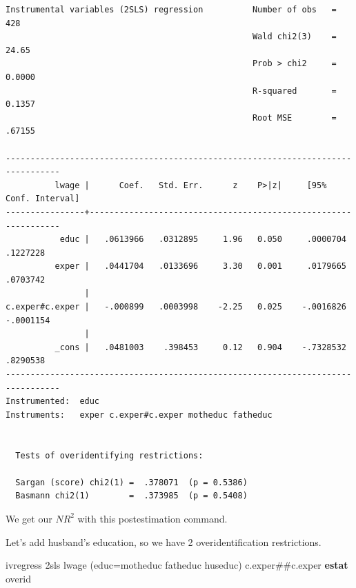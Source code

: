 \documentclass[
]{book}
\newenvironment{Shaded}{\begin{snugshade}}{\end{snugshade}}
\newcommand{\KeywordTok}[1]{\textcolor[rgb]{0.13,0.29,0.53}{\textbf{#1}}}
\newcommand{\NormalTok}[1]{#1}
\begin{document}
\begin{verbatim}
Instrumental variables (2SLS) regression          Number of obs   =        428
                                                  Wald chi2(3)    =      24.65
                                                  Prob > chi2     =     0.0000
                                                  R-squared       =     0.1357
                                                  Root MSE        =     .67155

---------------------------------------------------------------------------------
          lwage |      Coef.   Std. Err.      z    P>|z|     [95% Conf. Interval]
----------------+----------------------------------------------------------------
           educ |   .0613966   .0312895     1.96   0.050     .0000704    .1227228
          exper |   .0441704   .0133696     3.30   0.001     .0179665    .0703742
                |
c.exper#c.exper |   -.000899   .0003998    -2.25   0.025    -.0016826   -.0001154
                |
          _cons |   .0481003    .398453     0.12   0.904    -.7328532    .8290538
---------------------------------------------------------------------------------
Instrumented:  educ
Instruments:   exper c.exper#c.exper motheduc fatheduc


  Tests of overidentifying restrictions:

  Sargan (score) chi2(1) =  .378071  (p = 0.5386)
  Basmann chi2(1)        =  .373985  (p = 0.5408)
\end{verbatim}

We get our \(N R^2\) with this postestimation command.

Let's add husband's education, so we have 2 overidentification restrictions.

\begin{Shaded}
\begin{Highlighting}[]
\NormalTok{ivregress 2sls lwage (educ=motheduc fatheduc huseduc) c.exper\#\#c.exper}
\KeywordTok{estat}\NormalTok{ overid}
\end{Highlighting}
\end{Shaded}
\end{document}
